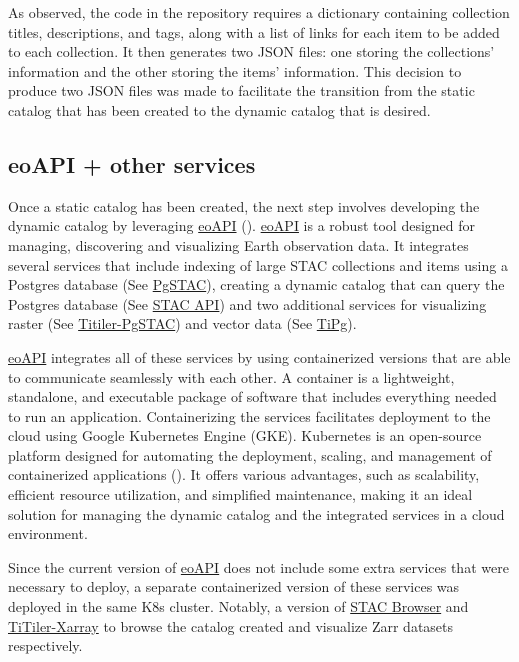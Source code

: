 \documentclass[
  oneside,
  open=any]{scrbook}
\begin{document}
As observed, the code in the repository requires a dictionary containing
collection titles, descriptions, and tags, along with a list of links
for each item to be added to each collection. It then generates two JSON
files: one storing the collections' information and the other storing
the items' information. This decision to produce two JSON files was made
to facilitate the transition from the static catalog that has been
created to the dynamic catalog that is desired.

\subsection{eoAPI + other services}\label{sec-eoapi}

Once a static catalog has been created, the next step involves
developing the dynamic catalog by leveraging
\href{https://eoapi.dev/}{eoAPI}
().
\href{https://eoapi.dev/}{eoAPI} is a robust tool designed for managing,
discovering and visualizing Earth observation data. It integrates
several services that include indexing of large STAC collections and
items using a Postgres database (See
\href{https://github.com/stac-utils/pgstac}{PgSTAC}), creating a dynamic
catalog that can query the Postgres database (See
\href{https://github.com/stac-utils/stac-fastapi}{STAC API}) and two
additional services for visualizing raster (See
\href{https://github.com/stac-utils/titiler-pgstac}{Titiler-PgSTAC}) and
vector data (See \href{https://github.com/developmentseed/tipg}{TiPg}).

\href{https://eoapi.dev/}{eoAPI} integrates all of these services by
using containerized versions that are able to communicate seamlessly
with each other. A container is a lightweight, standalone, and
executable package of software that includes everything needed to run an
application. Containerizing the services facilitates deployment to the
cloud using Google Kubernetes Engine (GKE). Kubernetes is an open-source
platform designed for automating the deployment, scaling, and management
of containerized applications
(). It offers
various advantages, such as scalability, efficient resource utilization,
and simplified maintenance, making it an ideal solution for managing the
dynamic catalog and the integrated services in a cloud environment.

Since the current version of \href{https://eoapi.dev/}{eoAPI} does not
include some extra services that were necessary to deploy, a separate
containerized version of these services was deployed in the same K8s
cluster. Notably, a version of
\href{https://github.com/radiantearth/stac-browser}{STAC Browser} and
\href{https://github.com/developmentseed/titiler-xarray}{TiTiler-Xarray}
to browse the catalog created and visualize Zarr datasets respectively.
\end{document}
